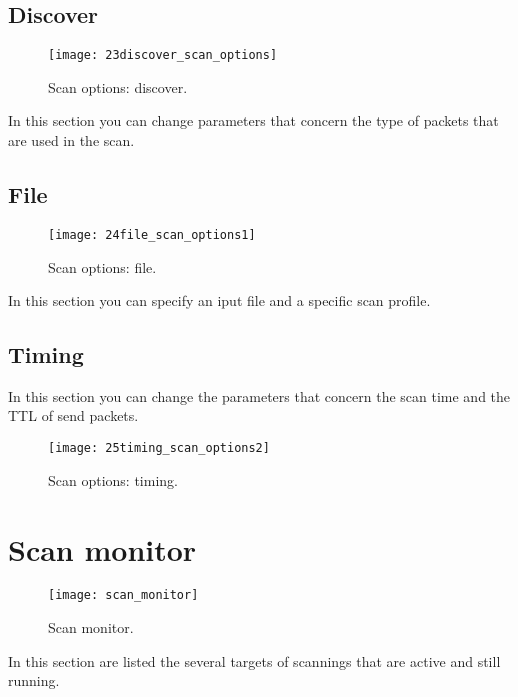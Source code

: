 \subsection{Discover}
\label{sec:ContentsScanOptionsScanDiscover}

\begin{figure}[h]
  \centering
  \texttt{[image: 23discover\_scan\_options]}
  \caption{Scan options: discover.}
  \label{fig:ContentsScanOptionsScanDiscover}
\end{figure}
In this section you can change parameters that concern the type of packets 
that are used in the scan.

\subsection{File}
\label{sec:ContentsScanOptionsScanFile}

\begin{figure}[h]
  \centering
  \texttt{[image: 24file\_scan\_options1]}
  \caption{Scan options: file.}
  \label{fig:ContentsScanOptionsScanFile}
\end{figure}
In this section you can specify an iput file and a specific scan profile.

\subsection{Timing}
\label{sec:ContentsScanOptionsScanTiming}

In this section you can change the parameters that concern the scan time and 
the TTL of send packets.
\begin{figure}[h]
  \centering
  \texttt{[image: 25timing\_scan\_options2]}
  \caption{Scan options: timing.}
  \label{fig:ConentsScanOptionsScanTiming}
\end{figure}


\section{Scan monitor}
\label{sec:ContentsScanMonitor}

\begin{figure}[h]
  \centering
  \texttt{[image: scan\_monitor]}
  \caption{Scan monitor.}
  \label{fig:ContentsScanMonitor}
\end{figure}
In this section are listed the several targets of scannings that are active 
and still running.

